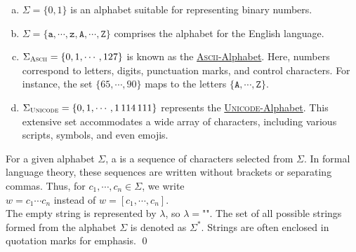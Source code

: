 \examplesEng
\begin{enumerate}[(a)]
\item \( \Sigma = \{ 0, 1 \} \) is an alphabet suitable for representing binary numbers.
\item \( \Sigma = \{ \mathtt{a}, \cdots, \mathtt{z}, \mathtt{A}, \cdots, \mathtt{Z} \} \) comprises the alphabet for the English language.
\item \( \Sigma_{\textsc{\scriptsize Ascii}} = \{ 0, 1, \cdots, 127 \} \) is known as the
      \href{http://en.wikipedia.org/wiki/ASCII}{\textsc{Ascii}-Alphabet}.  Here,
      numbers correspond to letters, digits, punctuation marks, and control characters. For instance, the set
      \( \{ 65, \cdots, 90 \} \) maps to the letters \( \{ \mathtt{A}, \cdots, \mathtt{Z} \} \).
\item \( \Sigma_{\textsc{\scriptsize Unicode}} = \{ 0, 1, \cdots, 1\,114\,111 \} \) represents the
      \href{https://en.wikipedia.org/wiki/Unicode}{\textsc{Unicode}-Alphabet}. 
      This extensive set accommodates a wide array of characters, including various scripts, symbols, and even emojis. 
\eox
\end{enumerate}

\begin{Definition}[Strings]
For a given alphabet \( \Sigma \), a   is a sequence of characters selected from \( \Sigma \). In formal language theory, these sequences are written without brackets or separating commas. Thus, for \( c_1, \cdots, c_n \in \Sigma \), we write
\\[0.2cm]
\hspace*{1.3cm}
\( w = c_1 \cdots c_n \) \quad instead of \quad \( w = [c_1, \cdots, c_n] \).
\\[0.2cm]
The empty string is represented by \( \lambda \), \index{\( \lambda \)} so \( \lambda = \texttt{""} \).
The set of all possible strings formed from the alphabet \( \Sigma \) is denoted as \( \Sigma^* \). \index{\( \Sigma^* \)} Strings are often enclosed in quotation marks for emphasis.
\qed
\end{Definition}

